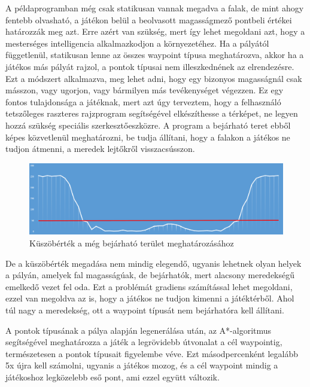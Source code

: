 A példaprogramban még csak statikusan vannak megadva a falak, de mint ahogy fentebb olvasható, a játékon belül a beolvasott magasságmező pontbeli értékei határozzák meg azt. Erre azért van szükség, mert így lehet megoldani azt, hogy a mesterséges intelligencia alkalmazkodjon a környezetéhez. Ha a pályától függetlenül, statikusan lenne az összes waypoint típusa meghatározva, akkor ha a játékos más pályát rajzol, a pontok típusai nem illeszkednének az elrendezésre. Ezt a módszert alkalmazva, meg lehet adni, hogy egy bizonyos magasságnál csak másszon, vagy ugorjon, vagy bármilyen más tevékenységet végezzen. Ez egy fontos tulajdonsága a játéknak, mert azt úgy terveztem, hogy a felhasználó tetszőleges raszteres rajzprogram segítségével elkészíthesse a térképet, ne legyen hozzá szükség speciális szerkesztőeszközre. A program a bejárható teret ebből képes közvetlenül meghatározni, be tudja állítani, hogy a falakon a játékos ne tudjon átmenni, a meredek lejtőkről visszacsússzon.

\begin{figure}[h]
\centering
\includegraphics[scale=0.44]{kepek/magassagmezo_kuszobertek_diagram.png}
\caption{Küszöbérték a még bejárható terület meghatározásához}
\label{fig:kuszobertek}
\end{figure}

De a küszöbérték megadása nem mindig elegendő, ugyanis lehetnek olyan helyek a pályán, amelyek fal magasságúak, de bejárhatók, mert alacsony meredekségű emelkedő vezet fel oda. Ezt a problémát gradiens számítással lehet megoldani, ezzel van megoldva az is, hogy a játékos ne tudjon kimenni a játéktérből. Ahol túl nagy a meredekség, ott a waypoint típusát nem bejárhatóra kell állítani.

\newpage
A pontok típusának a pálya alapján legenerálása után, az A*-algoritmus segítségével meghatározza a játék a legrövidebb útvonalat a cél waypointig, természetesen a pontok típusait figyelembe véve. Ezt másodpercenként legalább 5x újra kell számolni, ugyanis a játékos mozog, és a cél waypoint mindig a játékoshoz legközelebb eső pont, ami ezzel együtt változik.
